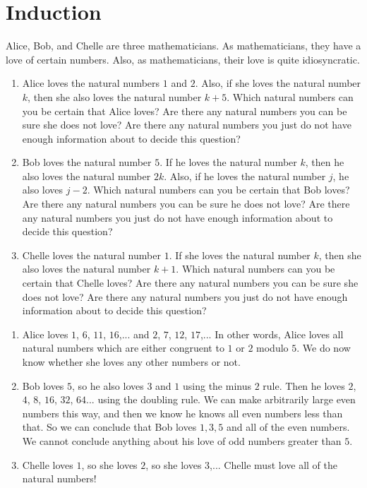 \section{Induction}

\begin{xca}

Alice, Bob, and Chelle are three mathematicians. As mathematicians, they have a love of certain numbers. Also, as mathematicians, their love is quite idiosyncratic.

\begin{enumerate}
\item Alice loves the natural numbers $1$ and $2$. Also, if she loves the natural number $k$, then she also loves the natural number $k+5$. Which natural numbers can you be certain that Alice loves? Are there any natural numbers you can be sure she does not love? Are there any natural numbers you just do not have enough information about to decide this question?

\item Bob loves the natural number $5$. If he loves the natural number $k$, then he also loves the natural number $2k$. Also, if he loves the natural number $j$, he also loves $j-2$. Which natural numbers can you be certain that Bob loves? Are there any natural numbers you can be sure he does not love? Are there any natural numbers you just do not have enough information about to decide this question?

\item Chelle loves the natural number $1$. If she loves the natural number $k$, then she also loves the natural number $k+1$. Which natural numbers can you be certain that Chelle loves? Are there any natural numbers you can be sure she does not love? Are there any natural numbers you just do not have enough information about to decide this question?
\end{enumerate}
\end{xca}

\begin{solutions}
	\begin{enumerate}
			\item Alice loves $1$, $6$, $11$, $16$,... and $2$, $7$, $12$, $17$,...
			In other words, Alice loves all natural numbers which are either congruent to $1$ or $2$ modulo $5$.  We do now know whether she loves any other numbers or not.
			\item Bob loves $5$, so he also loves $3$ and $1$ using the minus $2$ rule.  Then he loves $2$, $4$, $8$, $16$, $32$, $64$... using the doubling rule.  We can make arbitrarily large even numbers this way, and then we know he knows all even numbers less than that.  So we can conclude that Bob loves $1,3,5$ and all of the even numbers.  We cannot conclude anything about his love of odd numbers greater than $5$.
			\item Chelle loves $1$, so she loves $2$, so she loves $3$,...  Chelle must love all of the natural numbers!
		\end{enumerate}
	\end{solutions}

